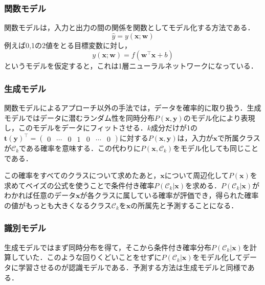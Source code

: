 \documentclass[a4paper,11pt]{jsreport}
\begin{document}
\subsubsection*{関数モデル}
関数モデルは，入力と出力の間の関係を関数としてモデル化する方法である．
\begin{equation}
  \hat{y} = y(\bm{x}; \bm{w})
\end{equation}
例えば0,1の2値をとる目標変数に対し，
\begin{equation}
  y(\bm{x}; \bm{w}) = f(\bm{w}^{\top} \bm{x} + b)
\end{equation}
というモデルを仮定すると，これは1層ニューラルネットワークになっている．

\subsubsection*{生成モデル}
関数モデルによるアプローチ以外の手法では，データを確率的に取り扱う．生成モデルではデータに潜むランダム性を同時分布$P(\bm{x}, \bm{y})$のモデル化により表現し，このモデルをデータにフィットさせる．$k$成分だけが1の$\bm{t}(\bm{y})^{\top} = \begin{pmatrix} 0 & \cdots & 0 & 1 & 0 & \cdots & 0 \end{pmatrix}$に対する$P(\bm{x}, \bm{y})$は，入力が$\bm{x}$で所属クラスが$\mathcal{C}_k$である確率を意味する．この代わりに$P(\bm{x}, \mathcal{C}_k)$をモデル化しても同じことである．\par
この確率をすべてのクラスについて求めたあと，$\bm{x}$について周辺化して$P(\bm{x})$を求めてベイズの公式を使うことで条件付き確率$P(\mathcal{C}_k | \bm{x})$を求める．$P(\mathcal{C}_k | \bm{x})$がわかれば任意のデータ$\bm{x}$が各クラスに属している確率が評価でき，得られた確率の値がもっとも大きくなるクラス$\mathcal{C}_k$を$\bm{x}$の所属先と予測することになる．

\subsubsection*{識別モデル}
生成モデルではまず同時分布を得て，そこから条件付き確率分布$P(\mathcal{C}_k | \bm{x})$を計算していた．このような回りくどいことをせずに$P(\mathcal{C}_k | \bm{x})$をモデル化してデータに学習させるのが認識モデルである．予測する方法は生成モデルと同様である．
\end{document}
